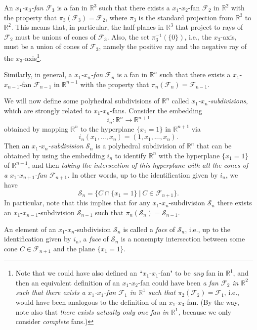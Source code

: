 \documentclass[12pt,letterpaper]{article}
\renewcommand{\S}{\mathcal{S}}
\newcommand{\F}{\mathcal{F}}
\newcommand{\RR}{\mathbb{R}}
\begin{document}
An {\em $x_1$-$x_3$-fan} $\F_3$ is a fan in $\RR^3$ such that there exists a $x_1$-$x_2$-fan $\F_2$ in $\RR^2$ with the property that $\pi_3(\F_3)=\F_2$, where $\pi_3$ is the standard projection from $\RR^3$ to $\RR^2$. 
This means that, in particular, the half-planes in $\RR^3$ that project to rays of $\F_2$ must be unions of cones of $\F_3$. Also, the set $\pi_3^{-1}(\{ 0 \})$, i.e., the $x_3$-axis, must be a union of cones of $\F_3$, namely the positive ray and the negative ray of the $x_3$-axis\footnote{Note that we could have also defined an ``$x_1$-$x_1$-fan" to be {\em any} fan in $\RR^1$, and then an equivalent definition of an $x_1$-$x_2$-fan could have been {\em a fan $\F_2$ in $\RR^2$ such that there exists a $x_1$-$x_1$-fan $\F_1$ in $\RR^1$ such that $\pi_2(\F_2)=\F_1$}, i.e., would have been analogous to the definition of an $x_1$-$x_3$-fan. (By the way, note also that {\em there exists actually only one fan in $\RR^1$,} because we only consider {\em complete} fans.)}. 

\noindent
Similarly, in general, a {\em $x_1$-$x_n$-fan} $\F_n$ is a fan in $\RR^n$ such that there exists a $x_1$-$x_{n-1}$-fan $\F_{n-1}$ in $\RR^{n-1}$ with the property that $\pi_n(\F_n)=\F_{n-1}$. 





\bigskip




We will now define some polyhedral subdivisions of  $\RR^n$ called {\em $x_1$-$x_n$-subdivisions}, which are strongly related to $x_1$-$x_n$-fans. Consider the embedding 
$$
i_n : \RR^n \to \RR^{n+1}
$$ 
obtained by mapping $\RR^n$ to the hyperplane $\{ x_1 = 1\}$ in $\RR^{n+1}$ via 
$$
i_n(x_1, ..., x_n) = (1, x_1, ..., x_n).
$$
Then an {\em $x_1$-$x_n$-subdivision} $\S_n$ is a polyhedral subdivision of $\RR^n$ that can be obtained by using the embedding $i_n$ to identify $\RR^n$ with  the hyperplane $\{ x_1 = 1\}$ of $ \RR^{n+1}$, and then {\em taking the intersection of this hyperplane with all the cones of a $x_1$-$x_{n+1}$-fan $\F_{n+1}$.} In other words, up to the identification given by $i_n$, we have
$$
\S_n = \{  C \cap \{ x_1 = 1\}  \  | \   C \in \F_{n+1}  \}.
$$
In particular, note that this implies that for any $x_1$-$x_n$-subdivision $\S_n$ there exists an $x_1$-$x_{n-1}$-subdivision $\S_{n-1}$ such that $\pi_n(\S_n)=\S_{n-1}$.

An element of an $x_1$-$x_n$-subdivision $\S_n$ is called a {\em face} of $\S_n$, i.e., up to the identification given by $i_n$, a {\em face} of $\S_n$ is a nonempty intersection between some cone $C \in \F_{n+1}$ and the plane $\{ x_1 = 1\}$.
\end{document}

